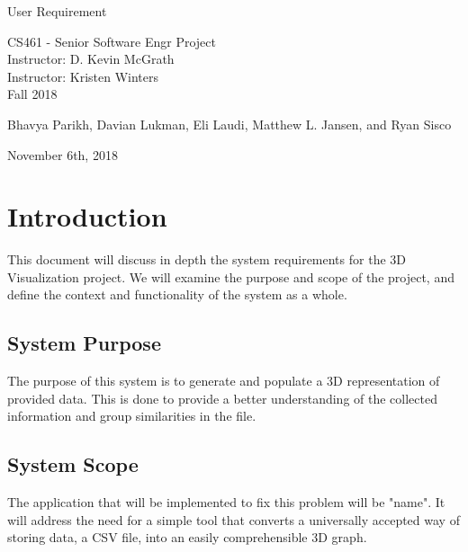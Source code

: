 \documentclass[letterpaper,10pt,titlepage, onecolumn, draftclsnofoot]{IEEEtran}
\begin{document}
\begin{titlepage}
\begin{center}
  
  \textbf{}

  \vspace{4cm}
  \Huge{}
  User Requirement
  \vspace{1.5cm}

 
  \LARGE
  CS461 - Senior Software Engr Project\\
  \vspace{0.25cm}
  Instructor: D. Kevin McGrath \\
  Instructor: Kristen Winters \\
  \vspace{0.25cm}
  Fall 2018 \\
  \vspace{1.5cm}
  
  \large{Bhavya Parikh, Davian Lukman, Eli Laudi, Matthew L. Jansen, and Ryan Sisco}\\
  \date{October 18th, 2018}
  \vfill
  November 6th, 2018\\
  \vspace{1cm}
  \vspace*{\fill}

   \normalsize 
\end{center}
\end{titlepage}
  
\section{Introduction}
\noindent This document will discuss in depth the system requirements for the 3D Visualization project. We will examine the purpose and scope of the project, and define the context and functionality of the system as a whole. 

    \subsection{System Purpose}
    \noindent The purpose of this system is to generate and populate a 3D representation of provided data. This is done to provide a better understanding of the collected information and group similarities in the file.

    \subsection{System Scope}
    \noindent The application that will be implemented to fix this problem will be "name". It will address the need for a simple tool that converts a universally accepted way of storing data, a CSV file, into an easily comprehensible 3D graph.
\end{document}
